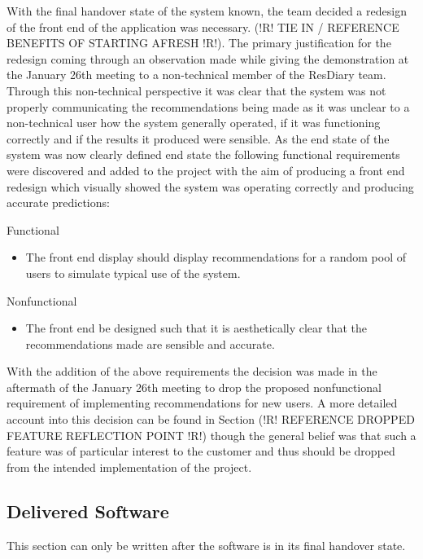 \documentclass{l3proj}
\begin{document}
With the final handover state of the system known, the team decided a redesign of the front end of the application was necessary. (!R! TIE IN / REFERENCE BENEFITS OF STARTING AFRESH !R!). The primary justification for the redesign coming through an observation made while giving the demonstration at the January 26th meeting to a non-technical member of the ResDiary team. Through this non-technical perspective it was clear that the system was not properly communicating the recommendations being made as it was unclear to a non-technical user how the system generally operated, if it was functioning correctly and if the results it produced were sensible. As the end state of the system was now clearly defined end state the following functional requirements were discovered and added to the project with the aim of producing a front end redesign which visually showed the system was operating correctly and producing accurate predictions:

Functional
\begin{itemize}
\item The front end display should display recommendations for a random pool of users to simulate typical use of the system.
\end{itemize}

Nonfunctional
\begin{itemize}
\item The front end be designed such that it is aesthetically clear that the recommendations made are sensible and accurate.
\end{itemize}

With the addition of the above requirements the decision was made in the aftermath of the January 26th meeting to drop the proposed nonfunctional requirement of implementing recommendations for new users. A more detailed account into this decision can be found in Section (!R! REFERENCE DROPPED FEATURE REFLECTION POINT !R!) though the general belief was that such a feature was of particular interest to the customer and thus should be dropped from the intended implementation of the project.


\subsection{Delivered Software}
\label{finsoftware}
This section can only be written after the software is in its final handover state.
\newpage
\end{document}
